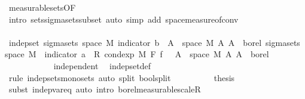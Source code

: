 \begin{isabellebody}
\ measurable{\isacharunderscore}{\kern0pt}sets{\isacharbrackleft}{\kern0pt}OF\ {\isacharasterisk}{\kern0pt}{\isacharbrackright}{\kern0pt}\ \isamarkupfalse%
\ {\isacharparenleft}{\kern0pt}intro\ sets{\isachardot}{\kern0pt}sigma{\isacharunderscore}{\kern0pt}sets{\isacharunderscore}{\kern0pt}subset{\isacharprime}{\kern0pt}{\isacharcomma}{\kern0pt}\ auto\ simp\ add{\isacharcolon}{\kern0pt}\ space{\isacharunderscore}{\kern0pt}measure{\isacharunderscore}{\kern0pt}of{\isacharunderscore}{\kern0pt}conv{\isacharparenright}{\kern0pt}\isanewline
\ \ \ \ \ \ \ \ \isamarkupfalse%
\isanewline
\ \ \ \ \ \ \ \ \isamarkupfalse%
\ {\isachardoublequoteopen}indep{\isacharunderscore}{\kern0pt}set\ {\isacharparenleft}{\kern0pt}sigma{\isacharunderscore}{\kern0pt}sets\ {\isacharparenleft}{\kern0pt}space\ M{\isacharparenright}{\kern0pt}\ {\isacharbraceleft}{\kern0pt}indicator\ b\ {\isacharminus}{\kern0pt}{\isacharbackquote}{\kern0pt}\ A\ {\isasyminter}\ space\ M\ {\isacharbar}{\kern0pt}A{\isachardot}{\kern0pt}\ A\ {\isasymin}\ borel{\isacharbraceright}{\kern0pt}{\isacharparenright}{\kern0pt}\ {\isacharparenleft}{\kern0pt}sigma{\isacharunderscore}{\kern0pt}sets\ {\isacharparenleft}{\kern0pt}space\ M{\isacharparenright}{\kern0pt}\ {\isacharbraceleft}{\kern0pt}{\isacharparenleft}{\kern0pt}{\isasymlambda}{\isasymomega}{\isachardot}{\kern0pt}\ indicator\ a\ {\isasymomega}\ {\isacharasterisk}{\kern0pt}\isactrlsub R\ cond{\isacharunderscore}{\kern0pt}exp\ M\ F\ f\ {\isasymomega}{\isacharparenright}{\kern0pt}\ {\isacharminus}{\kern0pt}{\isacharbackquote}{\kern0pt}\ A\ {\isasyminter}\ space\ M\ {\isacharbar}{\kern0pt}A{\isachardot}{\kern0pt}\ A\ {\isasymin}\ borel{\isacharbraceright}{\kern0pt}{\isacharparenright}{\kern0pt}{\isachardoublequoteclose}\ \isanewline
\ \ \ \ \ \ \ \ \ \ \isamarkupfalse%
\ independent\ \isamarkupfalse%
\ indep{\isacharunderscore}{\kern0pt}set{\isacharunderscore}{\kern0pt}def\ \isamarkupfalse%
\ {\isacharparenleft}{\kern0pt}rule\ indep{\isacharunderscore}{\kern0pt}sets{\isacharunderscore}{\kern0pt}mono{\isacharunderscore}{\kern0pt}sets{\isacharcomma}{\kern0pt}\ auto\ split{\isacharcolon}{\kern0pt}\ bool{\isachardot}{\kern0pt}split{\isacharparenright}{\kern0pt}\isanewline
\ \ \ \ \ \ \ \ \isamarkupfalse%
\ {\isacharquery}{\kern0pt}thesis\ \isamarkupfalse%
\ {\isacharparenleft}{\kern0pt}subst\ indep{\isacharunderscore}{\kern0pt}var{\isacharunderscore}{\kern0pt}eq{\isacharcomma}{\kern0pt}\ auto\ intro{\isacharbang}{\kern0pt}{\isacharcolon}{\kern0pt}\ borel{\isacharunderscore}{\kern0pt}measurable{\isacharunderscore}{\kern0pt}scaleR{\isacharparenright}{\kern0pt}\isanewline

\end{isabellebody}
